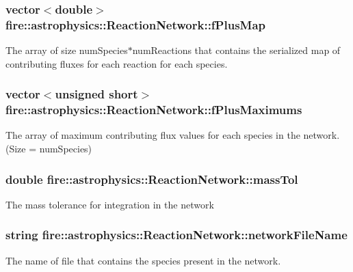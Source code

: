 \subsubsection[{\texorpdfstring{f\+Plus\+Map}{fPlusMap}}]{\setlength{\rightskip}{0pt plus 5cm}vector$<$double$>$ fire\+::astrophysics\+::\+Reaction\+Network\+::f\+Plus\+Map}\hypertarget{a00023_af3aa4184f759b2a8babf765667aa6604}{}\label{a00023_af3aa4184f759b2a8babf765667aa6604}
The array of size num\+Species$\ast$num\+Reactions that contains the serialized map of contributing fluxes for each reaction for each species. 
\subsubsection[{\texorpdfstring{f\+Plus\+Maximums}{fPlusMaximums}}]{\setlength{\rightskip}{0pt plus 5cm}vector$<$unsigned short$>$ fire\+::astrophysics\+::\+Reaction\+Network\+::f\+Plus\+Maximums}\hypertarget{a00023_a6682680b1f2975fa8dc1288d3c463693}{}\label{a00023_a6682680b1f2975fa8dc1288d3c463693}
The array of maximum contributing flux values for each species in the network. (Size = num\+Species) 
\subsubsection[{\texorpdfstring{mass\+Tol}{massTol}}]{\setlength{\rightskip}{0pt plus 5cm}double fire\+::astrophysics\+::\+Reaction\+Network\+::mass\+Tol}\hypertarget{a00023_ad3d95ecac758ca7efce6376904455123}{}\label{a00023_ad3d95ecac758ca7efce6376904455123}
The mass tolerance for integration in the network 
\subsubsection[{\texorpdfstring{network\+File\+Name}{networkFileName}}]{\setlength{\rightskip}{0pt plus 5cm}string fire\+::astrophysics\+::\+Reaction\+Network\+::network\+File\+Name}\hypertarget{a00023_abcc4209749ecd64d0ab9621210536ade}{}\label{a00023_abcc4209749ecd64d0ab9621210536ade}
The name of file that contains the species present in the network. 
